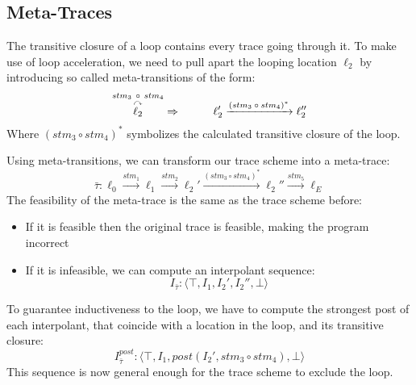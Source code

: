 \documentclass{article}
\begin{document}
\subsection{Meta-Traces}
The transitive closure of a loop contains every trace going through it. To make use of loop acceleration, we need to pull apart the looping location $\ell_2$ by introducing so called meta-transitions of the form:
\begin{equation*}
\overset{stm_3\ \circ \ stm_4}{\overset{\curvearrowright}{\ell_2}} \Rightarrow \hspace*{1cm} \ell_2' \xrightarrow{\text{$(stm_3 \circ stm_4)^*$}} \ell_2''
\end{equation*}
Where $(stm_3 \circ stm_4)^*$ symbolizes the calculated transitive closure of the loop. \par
Using meta-transitions, we can transform our trace scheme into a meta-trace:
\begin{equation*}
\bar{\tau}: \ell_0 \xrightarrow{\text{$stm_1$}} \ell_1 \xrightarrow{\text{$stm_2$}} \ell_2' \xrightarrow{\text{$(stm_3 \circ stm_4)^*$}} \ell_2'' \xrightarrow{\text{$stm_5$}} \ell_E
\end{equation*}
The feasibility of the meta-trace is the same as the trace scheme before: \\
\begin{itemize}
	\item  If it is feasible then the original trace is feasible, making the program incorrect
	\item If it is infeasible, we can compute an interpolant sequence: \\
	\begin{equation*}
	I_{\bar{\tau}}: \langle \top, I_1, I_2', I_2'', \bot  \rangle
	\end{equation*}
\end{itemize}

To guarantee inductiveness to the loop, we have to compute the strongest post of each interpolant, that coincide with a location in the loop, and its transitive closure:
\begin{equation*}
I_{\bar{\tau}}^{post}: \langle \top, I_1, post(I_2', stm_3 \circ stm_4), \bot  \rangle
\end{equation*}
This sequence is now general enough for the trace scheme to exclude the loop.
\end{document}
